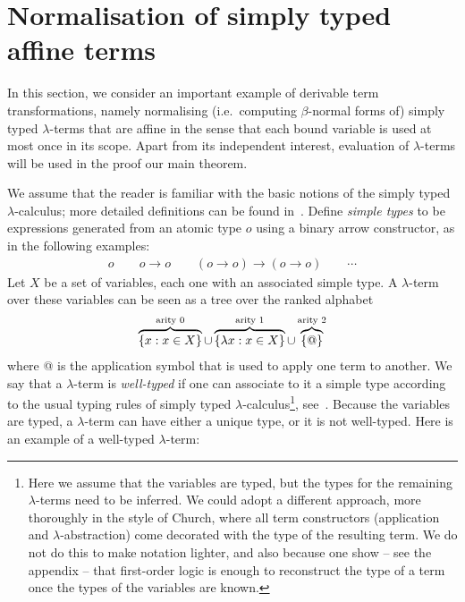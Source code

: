 \section{Normalisation of simply typed affine terms}
\label{sec:one-register}

In this section, we consider an important example of derivable term transformations, namely normalising (i.e.~computing $\beta$-normal forms of)  simply typed  $\lambda$-terms that are affine in the sense that each bound variable is used at most  once in its scope. Apart from its independent interest, evaluation of $\lambda$-terms will  be used in the proof our main theorem. 



\newcommand{\otype}{o}
We assume that the reader is familiar with the basic notions of the simply typed $\lambda$-calculus; more detailed definitions can be found in~\cite{sorensen_lectures_2006}. Define  \emph{simple types} to be expressions  generated from an atomic type $\otype$ using a binary arrow constructor, as in the following examples:
    \begin{align*}
        \otype \qquad \otype \to \otype \qquad (\otype \to \otype) \to (\otype \to \otype) \qquad \cdots 
    \end{align*}
Let $X$ be a set of variables, each one with an associated simple type.  A $\lambda$-term over these variables can be seen as a tree over the ranked alphabet
\begin{align*}
      \overbrace{\{x : x \in X\}}^{\text{arity 0}} \cup \overbrace{\{\lambda x : x \in X\}}^{\text{arity 1}} \cup  \overbrace{\{@\}}^{\text{arity 2}}
\end{align*}
where @ is the application symbol that is used to apply one term to another.
We say that a $\lambda$-term is \emph{well-typed} if one can associate  to it  a simple type according to the usual typing rules of simply typed $\lambda$-calculus\footnote{
    Here we assume that the variables are typed, but the types for the remaining $\lambda$-terms need to be inferred. We could adopt a different approach, more thoroughly in the style of Church, where all term constructors (application and $\lambda$-abstraction) come decorated with the type of the resulting term. We do not do this to make  notation lighter, and also because one show -- see the appendix -- that first-order logic is enough to reconstruct the type of a term once the types of the variables are known. 
}, see~\cite[Definition 3.2.1]{sorensen_lectures_2006}. Because the variables are typed, a  $\lambda$-term can have either a unique type, or it is not well-typed.  Here is an example of a well-typed $\lambda$-term: 

